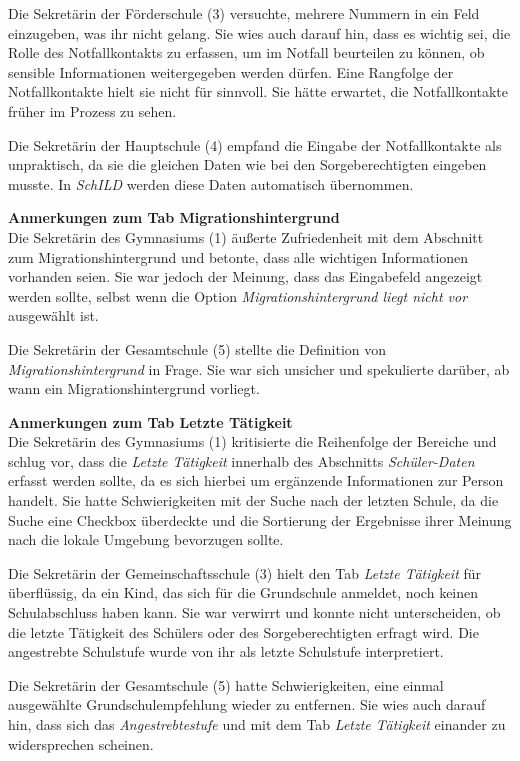 Die Sekretärin der Förderschule (3) versuchte, mehrere Nummern in ein Feld einzugeben, was ihr nicht gelang. Sie wies auch darauf hin, dass es wichtig sei, die Rolle des Notfallkontakts zu erfassen, um im Notfall beurteilen zu können, ob sensible Informationen weitergegeben werden dürfen. Eine Rangfolge der Notfallkontakte hielt sie nicht für sinnvoll. Sie hätte erwartet, die Notfallkontakte früher im Prozess zu sehen.

Die Sekretärin der Hauptschule (4) empfand die Eingabe der Notfallkontakte als unpraktisch, da sie die gleichen Daten wie bei den Sorgeberechtigten eingeben musste. In \textit{SchILD} werden diese Daten automatisch übernommen.

\textbf{Anmerkungen zum Tab \glqq Migrationshintergrund\grqq{}}\\
Die Sekretärin des Gymnasiums (1) äußerte Zufriedenheit mit dem Abschnitt zum Migrationshintergrund und betonte, dass alle wichtigen Informationen vorhanden seien. Sie war jedoch der Meinung, dass das Eingabefeld angezeigt werden sollte, selbst wenn die Option \textit{Migrationshintergrund liegt nicht vor\grqq} ausgewählt ist.

Die Sekretärin der Gesamtschule (5) stellte die Definition von \textit{Migrationshintergrund} in Frage. Sie war sich unsicher und spekulierte darüber, ab wann ein Migrationshintergrund vorliegt.

\textbf{Anmerkungen zum Tab \glqq Letzte Tätigkeit\grqq{}}\\
Die Sekretärin des Gymnasiums (1) kritisierte die Reihenfolge der Bereiche und schlug vor, dass die \textit{Letzte Tätigkeit} innerhalb des Abschnitts \textit{Schüler-Daten} erfasst werden sollte, da es sich hierbei um ergänzende Informationen zur Person handelt. Sie hatte Schwierigkeiten mit der Suche nach der letzten Schule, da die Suche eine Checkbox überdeckte und die Sortierung der Ergebnisse ihrer Meinung nach die lokale Umgebung bevorzugen sollte.

Die Sekretärin der Gemeinschaftsschule (3) hielt den Tab \textit{Letzte Tätigkeit} für überflüssig, da ein Kind, das sich für die Grundschule anmeldet, noch keinen Schulabschluss haben kann. Sie war verwirrt und konnte nicht unterscheiden, ob die letzte Tätigkeit des Schülers oder des Sorgeberechtigten erfragt wird. Die angestrebte Schulstufe wurde von ihr als letzte Schulstufe interpretiert.

Die Sekretärin der Gesamtschule (5) hatte Schwierigkeiten, eine einmal ausgewählte Grundschulempfehlung wieder zu entfernen. Sie wies auch darauf hin, dass sich das \textit{Angestrebtestufe} und mit dem Tab \textit{Letzte Tätigkeit} einander zu widersprechen scheinen.

